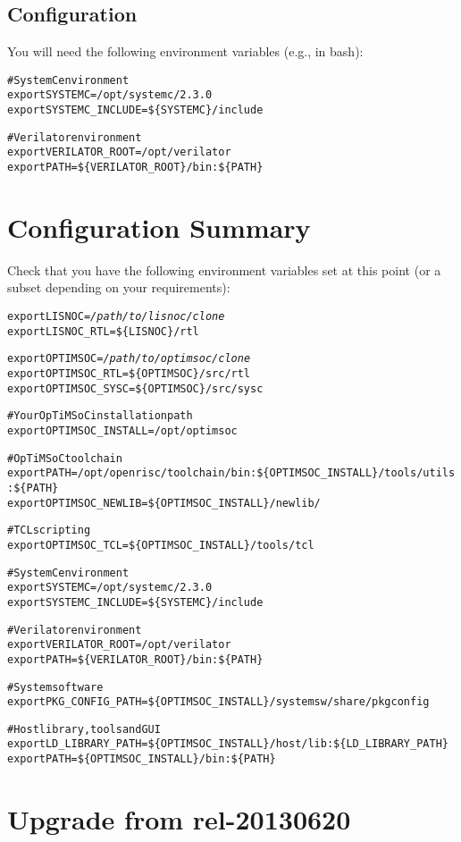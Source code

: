 \subsection{Configuration}

You will need the following environment variables (e.g., in bash):

\begin{alltt}
# SystemC environment
export SYSTEMC=/opt/systemc/2.3.0
export SYSTEMC_INCLUDE=\$\{SYSTEMC\}/include

# Verilator environment
export VERILATOR\_ROOT=/opt/verilator
export PATH=\$\{VERILATOR_ROOT\}/bin:\$\{PATH\}
\end{alltt}

\section{Configuration Summary}

Check that you have the following environment variables set at this
point (or a subset depending on your requirements):

\begin{alltt}
export LISNOC=\emph{/path/to/lisnoc/clone}
export LISNOC_RTL=\$\{LISNOC\}/rtl

export OPTIMSOC=\emph{/path/to/optimsoc/clone}
export OPTIMSOC_RTL=\$\{OPTIMSOC\}/src/rtl
export OPTIMSOC_SYSC=\$\{OPTIMSOC\}/src/sysc

# Your OpTiMSoC installation path
export OPTIMSOC_INSTALL=/opt/optimsoc

# OpTiMSoC toolchain
export PATH=/opt/openrisc/toolchain/bin:\$\{OPTIMSOC_INSTALL\}/tools/utils:\$\{PATH\}
export OPTIMSOC_NEWLIB=\$\{OPTIMSOC_INSTALL\}/newlib/

# TCL scripting
export OPTIMSOC_TCL=\$\{OPTIMSOC_INSTALL\}/tools/tcl

# SystemC environment
export SYSTEMC=/opt/systemc/2.3.0
export SYSTEMC_INCLUDE=\$\{SYSTEMC\}/include

# Verilator environment
export VERILATOR\_ROOT=/opt/verilator
export PATH=\$\{VERILATOR_ROOT\}/bin:\$\{PATH\}

# System software
export PKG_CONFIG_PATH=\$\{OPTIMSOC_INSTALL\}/systemsw/share/pkgconfig

# Host library, tools and GUI
export LD_LIBRARY_PATH=\$\{OPTIMSOC_INSTALL\}/host/lib:\$\{LD_LIBRARY_PATH\}
export PATH=\$\{OPTIMSOC_INSTALL\}/bin:\$\{PATH\}
\end{alltt}

\section{Upgrade from rel-20130620}

